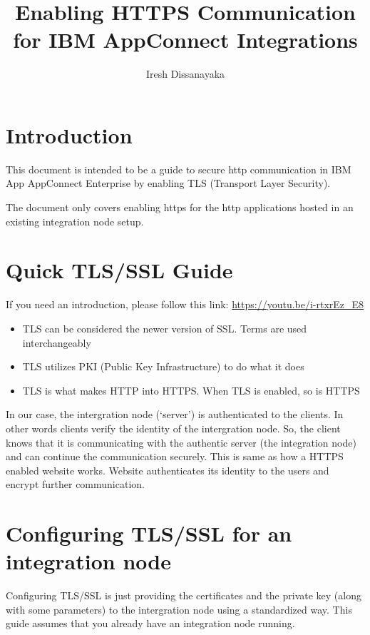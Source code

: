 \documentclass{article}
\author{Iresh Dissanayaka}
\title{Enabling HTTPS Communication for IBM AppConnect Integrations}
\begin{document}
    \maketitle

    \section{Introduction}
    This document is intended to be a guide to secure http communication in IBM App AppConnect Enterprise by enabling TLS (Transport Layer Security).
    
    \bigbreak
    
    The document only covers enabling https for the http applications hosted in an existing integration node setup.

    \section{Quick TLS/SSL Guide}
    If you need an introduction, please follow this link: \url{https://youtu.be/i-rtxrEz_E8}

    \begin{itemize}
        \item TLS can be considered the newer version of SSL. Terms are used interchangeably
        \item TLS utilizes PKI (Public Key Infrastructure) to do what it does
        \item TLS is what makes HTTP into HTTPS. When TLS is enabled, so is HTTPS
    \end{itemize}

    In our case, the intergration node (`server') is authenticated to the clients. In other words clients verify the identity of the intergration node. So, the client knows that it is communicating with the authentic server (the integration node) and can continue the communication securely.  This is same as how a HTTPS enabled website works. Website authenticates its identity to the users and encrypt further communication.
    
    \section{Configuring TLS/SSL for an integration node}
    \label{section_config_node}
    Configuring TLS/SSL is just providing the certificates and the private key (along with some parameters) to the intergration node using a standardized way. This guide assumes that you already have an integration node running.
\end{document}
